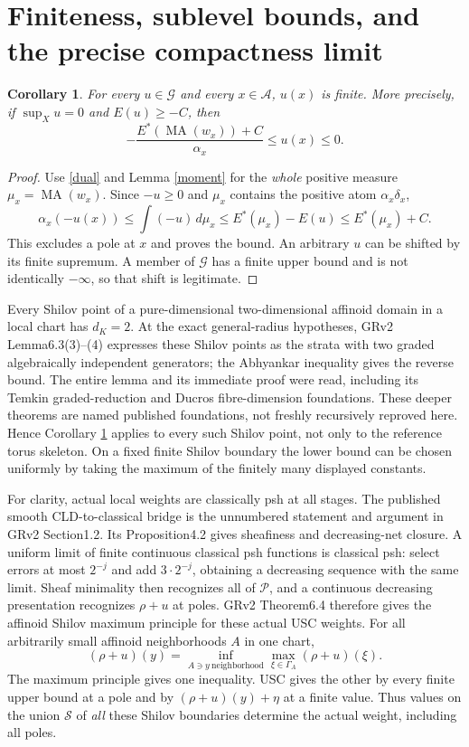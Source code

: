 \documentclass[11pt]{article}
\newcommand{\MA}{\operatorname{MA}}
\newcommand{\G}{\mathcal G}
\newtheorem{corollary}[theorem]{Corollary}
\theoremstyle{remark}\newtheorem{remark}[theorem]{Remark}
\begin{document}
\section{Finiteness, sublevel bounds, and the precise compactness limit}
\begin{corollary}\label{finite}
For every $u\in\G$ and every $x\in\mathscr A$, $u(x)$ is finite.
More precisely, if $\sup_Xu=0$ and $E(u)\ge-C$, then
\[
 -\frac{E^*(\MA(w_x))+C}{\alpha_x}\le u(x)\le0 .
\]
\end{corollary}
\begin{proof}
Use \eqref{dual} and Lemma \ref{moment} for the \emph{whole}
positive measure $\mu_x=\MA(w_x)$.
Since $-u\ge0$ and $\mu_x$ contains the positive atom
$\alpha_x\delta_x$,
\[
 \alpha_x(-u(x))\le\int(-u)\,d\mu_x
 \le E^*(\mu_x)-E(u)\le E^*(\mu_x)+C.
\]
This excludes a pole at $x$ and proves the bound.
An arbitrary $u$ can be shifted by its finite supremum.
A member of $\G$ has a finite upper bound and is not identically
$-\infty$, so that shift is legitimate.
\end{proof}

Every Shilov point of a pure-dimensional two-dimensional affinoid
domain in a local chart has $d_K=2$. At the exact general-radius
hypotheses, GRv2 Lemma6.3(3)--(4) expresses these Shilov points as
the strata with two graded algebraically independent generators;
the Abhyankar inequality gives the reverse bound.
The entire lemma and its immediate proof were read, including its
Temkin graded-reduction and Ducros fibre-dimension foundations.
These deeper theorems are named published foundations, not freshly
recursively reproved here. Hence Corollary \ref{finite} applies to
every such Shilov point, not only to the reference torus skeleton.
On a fixed finite Shilov boundary the lower bound can be chosen
uniformly by taking the maximum of the finitely many displayed
constants.

For clarity, actual local weights are classically psh at all
stages. The published smooth CLD-to-classical bridge is the
unnumbered statement and argument in GRv2 Section1.2.
Its Proposition4.2 gives sheafiness and decreasing-net
closure. A uniform limit of finite continuous classical psh
functions is classical psh: select errors at most $2^{-j}$ and add
$3\cdot2^{-j}$, obtaining a decreasing sequence with the same limit.
Sheaf minimality then recognizes all of $\mathscr P$, and a
continuous decreasing presentation recognizes $\rho+u$ at poles.
GRv2 Theorem6.4 therefore gives the affinoid Shilov maximum
principle for these actual USC weights.
For all arbitrarily small affinoid neighborhoods $A$ in one chart,
\[
 (\rho+u)(y)=\inf_{A\ni y\ \mathrm{neighborhood}}
                \max_{\xi\in\Gamma_A}(\rho+u)(\xi).
\]
The maximum principle gives one inequality. USC gives the other
by every finite upper bound at a pole and by
$(\rho+u)(y)+\eta$ at a finite value. Thus values on the union
$\mathscr S$ of \emph{all} these Shilov boundaries determine the
actual weight, including all poles.
\end{document}
